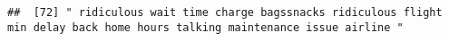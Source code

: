 \documentclass[
]{article}
\begin{document}
\begin{verbatim}
##  [72] " ridiculous wait time charge bagssnacks ridiculous flight min delay back home hours talking maintenance issue airline "                                                                                                                                                                                                                                                                                                                                                                                                                                                                                                                                                                                                                                                                                                                                                                                                                                                                                                                                                                                                                                                                                                                                                                                                                                                                                                                                                                                                                                                                                                                                                                                                                                                                        

\end{verbatim}
\end{document}

